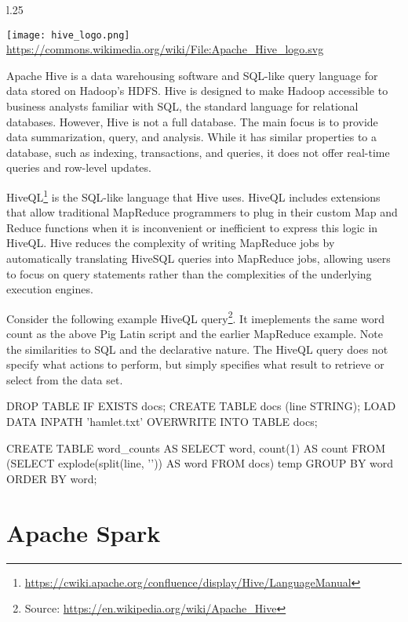 \begin{wrapfigure}{l}{.25\textwidth}
\begin{center}
\texttt{[image: hive\_logo.png]} \\
\tiny\url{https://commons.wikimedia.org/wiki/File:Apache_Hive_logo.svg}
\end{center}
\end{wrapfigure}
Apache Hive is a data warehousing software and SQL-like query language for data stored on Hadoop's HDFS. Hive is designed to make Hadoop accessible to business analysts familiar with SQL, the standard language for relational databases. However, Hive is not a full database. The main focus is to provide data summarization, query, and analysis. While it has similar properties to a database, such as indexing, transactions, and queries, it does not offer real-time queries and row-level updates.

HiveQL\footnote{\url{https://cwiki.apache.org/confluence/display/Hive/LanguageManual}} is the SQL-like language that Hive uses. HiveQL includes extensions that allow traditional MapReduce programmers to plug in their custom Map and Reduce functions when it is inconvenient or inefficient to express this logic in HiveQL. Hive reduces the complexity of writing MapReduce jobs by automatically translating HiveSQL queries into MapReduce jobs, allowing users to focus on query statements rather than the complexities of the underlying execution engines.

Consider the following example HiveQL query\footnote{\small Source: \url{https://en.wikipedia.org/wiki/Apache_Hive}}. It imeplements the same word count as the above Pig Latin script and the earlier MapReduce example. Note the similarities to SQL and the declarative nature. The HiveQL query does not specify what actions to perform, but simply specifies what result to retrieve or select from the data set. 

\begin{sqlcode}
DROP TABLE IF EXISTS docs;
CREATE TABLE docs (line STRING);
LOAD DATA INPATH 'hamlet.txt' 
  OVERWRITE INTO TABLE docs;
  
CREATE TABLE word_counts AS
SELECT word, count(1) AS count FROM
  (SELECT explode(split(line, '\s')) 
    AS word FROM docs) temp
GROUP BY word
ORDER BY word;
\end{sqlcode}

\section{Apache Spark}

